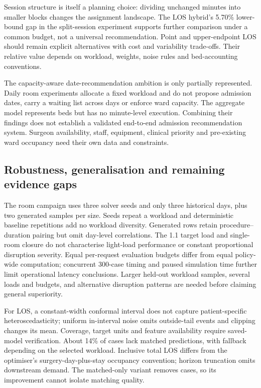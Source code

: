 Session structure is itself a planning choice: dividing unchanged minutes
into smaller blocks changes the assignment landscape. The LOS hybrid's
5.70\% lower-bound gap in the split-session experiment supports further
comparison under a common budget, not a universal recommendation. Point and
upper-endpoint LOS should remain explicit alternatives with cost and
variability trade-offs. Their relative value depends on workload, weights,
noise rules and bed-accounting conventions.

The capacity-aware date-recommendation ambition is only partially represented. Daily room
experiments allocate a fixed workload and do not propose admission dates,
carry a waiting list across days or enforce ward capacity. The aggregate
model represents beds but has no minute-level execution. Combining their
findings does not establish a validated end-to-end admission recommendation
system. Surgeon availability, staff, equipment, clinical priority and
pre-existing ward occupancy need their own data and constraints.

\subsection{Robustness, generalisation and remaining evidence gaps}

The room campaign uses three solver seeds and only three historical days,
plus two generated samples per size. Seeds repeat a workload and deterministic
baseline repetitions add no workload diversity. Generated rows retain
procedure--duration pairing but omit day-level correlations. The 1.1 target
load and single-room closure do not characterise light-load performance or
constant proportional disruption severity. Equal per-request evaluation
budgets differ from equal policy-wide computation; concurrent 300-case timing
and paused simulation time further limit operational latency conclusions.
Larger held-out workload samples, several loads and budgets, and alternative
disruption patterns are needed before claiming general superiority.

For LOS, a constant-width conformal interval does not capture patient-specific
heteroscedasticity; uniform in-interval noise omits outside-tail events and
clipping changes its mean. Coverage, target units and feature availability
require saved-model verification. About 14\% of cases lack matched predictions,
with fallback depending on the selected workload. Inclusive total LOS differs
from the optimiser's surgery-day-plus-stay occupancy convention; horizon
truncation omits downstream demand. The matched-only variant removes cases,
so its improvement cannot isolate matching quality.

